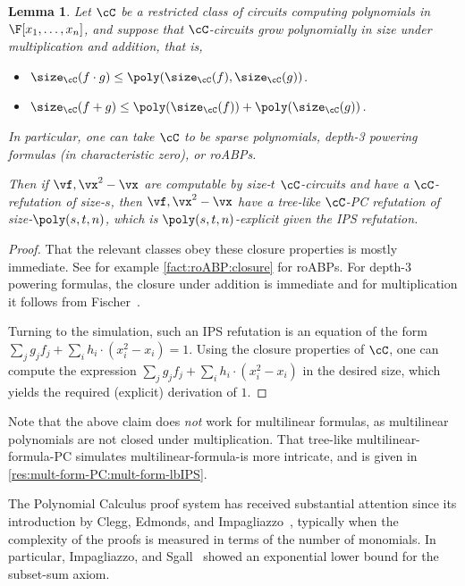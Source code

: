 \documentclass[11pt]{article}
\numberwithin{equation}{section}
\newtheorem{lemma}[theorem]{Lemma}
\theoremstyle{definition}
\theoremstyle{plain}
\begin{document}
\begin{lemma}\label{res:ips-vs-pc}
        Let $\cC$ be a restricted class of circuits computing polynomials in $\F[x_1,\ldots,x_n]$, and suppose that $\cC$-circuits grow polynomially in size under multiplication and addition, that is,
        \begin{itemize}
                \item $\size_\cC(f\cdot g)\le \poly(\size_\cC(f),\size_\cC(g))$.
                \item $\size_\cC(f+g)\le \poly(\size_\cC(f))+\poly(\size_\cC(g))$.
        \end{itemize}
        In particular, one can take $\cC$ to be sparse polynomials, depth-3 powering formulas (in characteristic zero), or roABPs.

        Then if $\vf,\vx^2-\vx$ are computable by size-$t$ $\cC$-circuits and have a $\cC$-\lIPS refutation of size-$s$, then $\vf,\vx^2-\vx$ have a tree-like $\cC$-PC refutation of size-$\poly(s,t,n)$, which is $\poly(s,t,n)$-explicit given the IPS refutation.
\end{lemma}
\begin{proof}
        That the relevant classes obey these closure properties is mostly immediate. See for example \autoref{fact:roABP:closure} for roABPs.  For depth-3 powering formulas, the closure under addition is immediate and for multiplication it follows from Fischer~\cite{Fischer94}.

        Turning to the simulation, such an IPS refutation is an equation of the form $\sum_j g_jf_j+\sum_i h_i\cdot (x_i^2-x_i)=1$. Using the closure properties of $\cC$, one can compute the expression $\sum_j g_jf_j+\sum_i h_i\cdot (x_i^2-x_i)$ in the desired size, which yields the required (explicit) derivation of $1$.
\end{proof}

Note that the above claim does \emph{not} work for multilinear formulas, as multilinear polynomials are not closed under multiplication.  That tree-like multilinear-formula-PC simulates multilinear-formula-\lIPS is more intricate, and is given in \autoref{res:mult-form-PC:mult-form-lbIPS}.

The Polynomial Calculus proof system has received substantial attention since its introduction by Clegg, Edmonds, and Impagliazzo~\cite{CleggEI96}, typically when the complexity of the proofs is measured in terms of the number of monomials. In particular, Impagliazzo, \Pudlak and Sgall~\cite{IPS99} showed an exponential lower bound for the subset-sum axiom.
\end{document}
